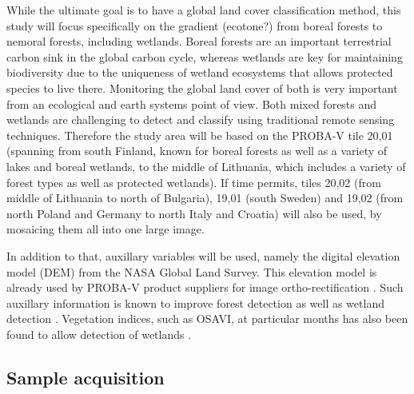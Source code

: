 \documentclass[a4paper,10pt]{article}
\begin{document}
While the ultimate goal is to have a global land cover classification method, this study will focus specifically on the gradient (ecotone?) from boreal forests to nemoral forests, including wetlands. Boreal forests are an important terrestrial carbon sink in the global carbon cycle, whereas wetlands are key for maintaining biodiversity due to the uniqueness of wetland ecosystems that allows protected species to live there. Monitoring the global land cover of both is very important from an ecological and earth systems point of view. Both mixed forests and wetlands are challenging to detect and classify using traditional remote sensing techniques. Therefore the study area will be based on the PROBA-V tile 20,01 (spanning from south Finland, known for boreal forests as well as a variety of lakes and boreal wetlands, to the middle of Lithuania, which includes a variety of forest types as well as protected wetlands). If time permits, tiles 20,02 (from middle of Lithuania to north of Bulgaria), 19,01 (south Sweden) and 19,02 (from north Poland and Germany to north Italy and Croatia) will also be used, by mosaicing them all into one large image.

In addition to that, auxillary variables will be used, namely the digital elevation model (DEM) from the NASA Global Land Survey. This elevation model is already used by PROBA-V product suppliers for image ortho-rectification \cite{probavguide}. Such auxillary information is known to improve forest detection as well as wetland detection \cite{sader1995wetlands}. Vegetation indices, such as OSAVI, at particular months has also been found to allow detection of wetlands \cite{davranche2010wetland}.

\subsection{Sample acquisition}
\end{document}
